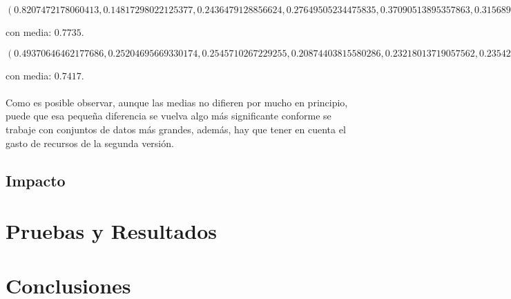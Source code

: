 \documentclass{article}
\begin{document}
    \[(0.8207472178060413, 0.14817298022125377, 0.2436479128856624, 0.27649505234475835, 0.37090513895357863, 0.3156890796375775, 0.43145311916324236, 0.29075274177467597, 0.359843417075467, 0.927856261143876, 1.333425567238517, 1.2416312895817385, 2.259662102473498, 1.809371031348172)\]

    con media: $0.7735$.

    \[(0.49370646462177686, 0.25204695669330174, 0.2545710267229255, 0.20874403815580286, 0.23218013719057562, 0.23542445644647558, 0.2920592193808883, 0.3730704569769219, 0.47244897959183674, 0.6780619111709287, 1.13201517874975, 1.8333333333333335, 1.2628692816915323, 2.6636148094109067)\]

    con media: $0.7417$.
    \\
    \\
    Como es posible observar, aunque las medias no difieren por mucho en principio, puede que esa pequeña diferencia se vuelva algo más significante conforme se trabaje con conjuntos de datos más grandes, además, hay que tener en cuenta el gasto de recursos de la segunda versión.

    \subsection{Impacto}

  \section{Pruebas y Resultados}

  \section{Conclusiones}
\end{document}
